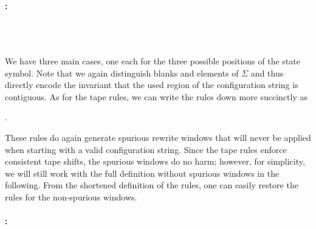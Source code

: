 \paragraph{:}
\begin{center}
  \quad {} \\
  \quad {} 
  \quad {} \\
  \quad {}
\end{center}

We have three main cases, one each for the three possible positions of the state symbol. Note that we again distinguish blanks and elements of $\Sigma$ and thus directly encode the invariant that the used region of the configuration string is contiguous. 
As for the tape rules, we can write the rules down more succinctly as 
\begin{center}
  \quad {}
  \quad {}. 
\end{center}
These rules do again generate spurious rewrite windows that will never be applied when starting with a valid configuration string. Since the tape rules enforce consistent tape shifts, the spurious windows do no harm; however, for simplicity, we will still work with the full definition without spurious windows in the following. 
From the shortened definition of the rules, one can easily restore the rules for the non-spurious windows.

\paragraph{:}
\begin{center}
  \quad {}
  \quad {}
\end{center}

